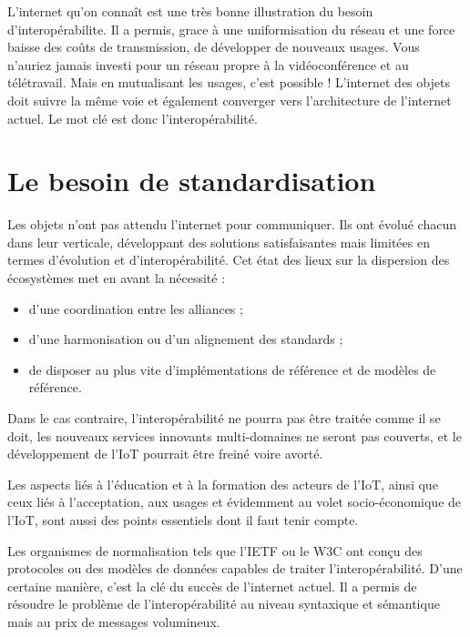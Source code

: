 L'internet qu'on connaît est une très bonne illustration du besoin d'interopérabilite. Il a permis, grace à une uniformisation du réseau et une force baisse des coûts de transmission, de développer de nouveaux usages. Vous n'auriez jamais investi pour un réseau propre à la vidéoconférence et au télétravail. Mais en mutualisant les usages, c'est possible ! L'internet des objets doit suivre la même voie et également converger vers l'architecture de l'internet actuel. Le mot clé est donc l'interopérabilité.  
   \vspace{2em}

\section{Le besoin de standardisation}
  \vspace{1em}

Les objets n'ont pas attendu l'internet pour communiquer. Ils ont évolué chacun dans leur verticale, développant des solutions satisfaisantes mais limitées en termes d'évolution et d'interopérabilité. Cet état des lieux sur la dispersion des écosystèmes met en avant la nécessité :

\begin{itemize}
\item d’une coordination entre les alliances ;
\item d’une harmonisation ou d’un alignement des standards ;
\item de disposer au plus vite d’implémentations de référence et de modèles de référence.
\end{itemize}

Dans le cas contraire, l’interopérabilité ne pourra pas être traitée comme il se doit, les nouveaux services innovants multi-domaines ne seront pas couverts, et le développement de l’IoT pourrait être freiné voire avorté.

Les aspects liés à l’éducation et à la formation des acteurs de l’IoT, ainsi que ceux liés à l’acceptation, aux usages et évidemment au volet socio-économique de l’IoT, sont aussi des points essentiels dont il faut tenir compte.

Les organismes de normalisation tels que l’\ac{IETF} ou le \ac{W3C} ont conçu des protocoles ou des modèles de données capables de traiter l’interopérabilité. D’une certaine manière, c’est la clé du succès de l’internet actuel. Il a permis de résoudre le problème de l’interopérabilité au niveau syntaxique et sémantique mais au prix de messages volumineux.

